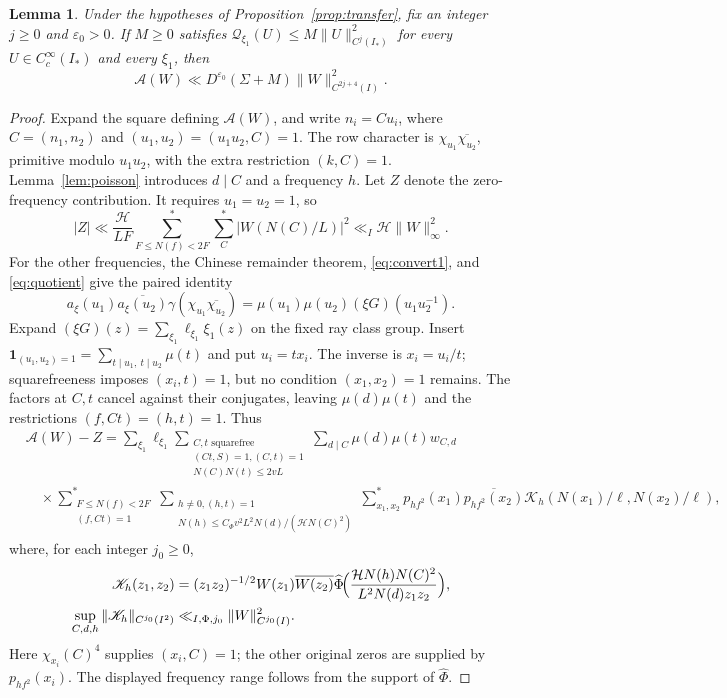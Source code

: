 \documentclass[11pt,a4paper]{article}
\numberwithin{equation}{section}
\numberwithin{figure}{section}
\newtheorem{lemma}[theorem]{Lemma}
\theoremstyle{definition}
\theoremstyle{remark}
\newcommand{\ind}{\mathbf1}
\begin{document}
\begin{lemma}\label{lem:first-transfer}
Under the hypotheses of Proposition~\ref{prop:transfer}, fix an integer
$j\ge0$ and $\varepsilon_0>0$. If $M\ge0$ satisfies
$\mathcal Q_{\xi_1}(U)\le M\|U\|_{C^j(I_*)}^2$
for every $U\in C_c^\infty(I_*)$ and every $\xi_1$, then
\[
 \mathcal A(W)\ll D^{\varepsilon_0}(\Sigma+M)
                    \|W\|_{C^{2j+4}(I)}^2.
\]
\end{lemma}
\begin{proof}
Expand the square defining $\mathcal A(W)$, and write
$n_i=Cu_i$, where $C=(n_1,n_2)$ and
$(u_1,u_2)=(u_1u_2,C)=1$. The row character is
$\chi_{u_1}\overline{\chi_{u_2}}$, primitive modulo $u_1u_2$,
with the extra restriction $(k,C)=1$.
Lemma~\ref{lem:poisson} introduces $d\mid C$ and a frequency $h$.
Let $Z$ denote the zero-frequency contribution. It requires $u_1=u_2=1$, so
\[
 |Z|\ll\frac{\mathcal H}{LF}
       \sum_{F\le N(f)<2F}^*\sum_C^*|W(N(C)/L)|^2
 \ll_I\mathcal H\|W\|_\infty^2.
\]
For the other frequencies, the Chinese remainder theorem,
\eqref{eq:convert1}, and \eqref{eq:quotient} give the paired identity
\begin{equation}\label{eq:paired-first-gauss}
 a_\xi(u_1)\overline{a_\xi(u_2)}
 \gamma(\chi_{u_1}\overline{\chi_{u_2}})
 =\mu(u_1)\mu(u_2)(\xi G)(u_1u_2^{-1}).
\end{equation}
Expand $(\xi G)(z)=\sum_{\xi_1}\ell_{\xi_1}\xi_1(z)$ on the
fixed ray class group. Insert
$\ind_{(u_1,u_2)=1}=\sum_{t\mid u_1,\ t\mid u_2}\mu(t)$ and put
$u_i=tx_i$. The inverse is $x_i=u_i/t$; squarefreeness imposes
$(x_i,t)=1$, but no condition $(x_1,x_2)=1$ remains.
The factors at $C,t$ cancel against their conjugates, leaving
$\mu(d)\mu(t)$ and the restrictions $(f,Ct)=(h,t)=1$.
Thus
\[
 \begin{aligned}
 &\mathcal A(W)-Z
 =\sum_{\xi_1}\ell_{\xi_1}
 \sum_{\substack{C,t\text{ squarefree}\\(Ct,S)=1, (C,t)=1\\
                  N(C)N(t)\le2vL}}
 \sum_{d\mid C}\mu(d)\mu(t)w_{C,d}\\
 &\quad\times\sum_{\substack{F\le N(f)<2F\\(f,Ct)=1}}^*
 \sum_{\substack{h\ne0, (h,t)=1\\
         N(h)\le C_\Phi v^2L^2N(d)/(\mathcal H N(C)^2)}} \sum_{x_1,x_2}^*
 p_{hf^2}(x_1)\overline{p_{hf^2}(x_2)}
 \mathscr K_h(N(x_1)/\ell,N(x_2)/\ell),
 \end{aligned}
\]
where, for each integer $j_0\ge0$,
\[
 \begin{aligned}
 \mathscr K_h(z_1,z_2)
 &=(z_1z_2)^{-1/2}W(z_1)\overline{W(z_2)}
 \widehat\Phi\!\Bigl(
  \frac{\mathcal H N(h)N(C)^2}{L^2N(d)z_1z_2}\Bigr),\\
 \sup_{C,d,h}\|\mathscr K_h\|_{C^{j_0}(I^2)}
 &\ll_{I,\Phi,j_0}\|W\|_{C^{j_0}(I)}^2.
 \end{aligned}
\]
Here $\chi_{x_i}(C)^4$ supplies $(x_i,C)=1$; the other original
zeros are supplied by $p_{hf^2}(x_i)$. The displayed frequency
range follows from the support of $\widehat\Phi$.


\end{proof}
\end{document}
